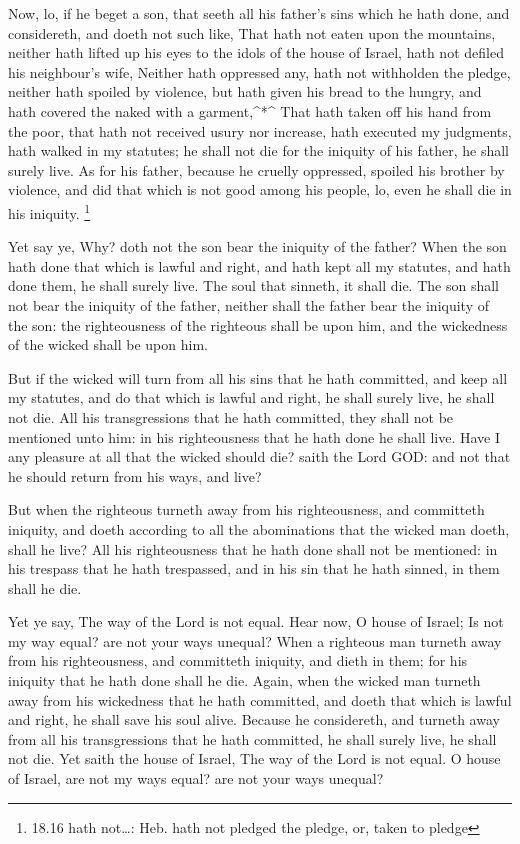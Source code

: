  Now, lo, if he beget a son, that seeth all his father's
sins which he hath done, and considereth, and doeth not such like,
 That hath not eaten upon the mountains, neither hath
lifted up his eyes to the idols of the house of Israel, hath not defiled
his neighbour's wife,  Neither hath oppressed any, hath not
withholden the pledge, neither hath spoiled by violence, but hath given
his bread to the hungry, and hath covered the naked with a
garment,\^{}*\^{}  That hath taken off his hand from the
poor, that hath not received usury nor increase, hath executed my
judgments, hath walked in my statutes; he shall not die for the iniquity
of his father, he shall surely live.  As for his father,
because he cruelly oppressed, spoiled his brother by violence, and did
that which is not good among his people, lo, even he shall die in his
iniquity. \footnote{18.16 hath not\ldots: Heb. hath not pledged the
  pledge, or, taken to pledge}

 Yet say ye, Why? doth not the son bear the iniquity of the
father? When the son hath done that which is lawful and right, and hath
kept all my statutes, and hath done them, he shall surely live.
 The soul that sinneth, it shall die. The son shall not
bear the iniquity of the father, neither shall the father bear the
iniquity of the son: the righteousness of the righteous shall be upon
him, and the wickedness of the wicked shall be upon him.

 But if the wicked will turn from all his sins that he hath
committed, and keep all my statutes, and do that which is lawful and
right, he shall surely live, he shall not die.  All his
transgressions that he hath committed, they shall not be mentioned unto
him: in his righteousness that he hath done he shall live. 
Have I any pleasure at all that the wicked should die? saith the Lord
GOD: and not that he should return from his ways, and live?

 But when the righteous turneth away from his
righteousness, and committeth iniquity, and doeth according to all the
abominations that the wicked man doeth, shall he live? All his
righteousness that he hath done shall not be mentioned: in his trespass
that he hath trespassed, and in his sin that he hath sinned, in them
shall he die.

 Yet ye say, The way of the Lord is not equal. Hear now, O
house of Israel; Is not my way equal? are not your ways unequal?
 When a righteous man turneth away from his righteousness,
and committeth iniquity, and dieth in them; for his iniquity that he
hath done shall he die.  Again, when the wicked man turneth
away from his wickedness that he hath committed, and doeth that which is
lawful and right, he shall save his soul alive.  Because he
considereth, and turneth away from all his transgressions that he hath
committed, he shall surely live, he shall not die.  Yet
saith the house of Israel, The way of the Lord is not equal. O house of
Israel, are not my ways equal? are not your ways unequal?

